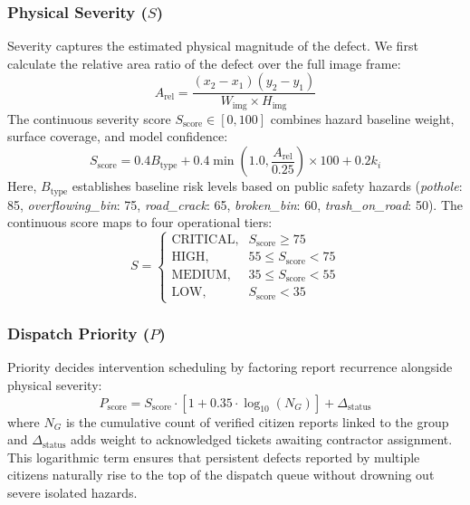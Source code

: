 \subsubsection{Physical Severity ($S$)}
Severity captures the estimated physical magnitude of the defect. We first calculate the relative area ratio of the defect over the full image frame:
\begin{equation}
A_{\text{rel}} = \frac{(x_2 - x_1)(y_2 - y_1)}{W_{\text{img}} \times H_{\text{img}}}
\end{equation}
The continuous severity score $S_{\text{score}} \in [0, 100]$ combines hazard baseline weight, surface coverage, and model confidence:
\begin{equation}
S_{\text{score}} = 0.4 B_{\text{type}} + 0.4 \min\left(1.0, \frac{A_{\text{rel}}}{0.25}\right) \times 100 + 0.2 k_i
\end{equation}
Here, $B_{\text{type}}$ establishes baseline risk levels based on public safety hazards (\textit{pothole}: 85, \textit{overflowing\_bin}: 75, \textit{road\_crack}: 65, \textit{broken\_bin}: 60, \textit{trash\_on\_road}: 50). The continuous score maps to four operational tiers:
\begin{equation}
S = \begin{cases} 
\text{CRITICAL}, & S_{\text{score}} \ge 75 \\
\text{HIGH}, & 55 \le S_{\text{score}} < 75 \\
\text{MEDIUM}, & 35 \le S_{\text{score}} < 55 \\
\text{LOW}, & S_{\text{score}} < 35 
\end{cases}
\end{equation}

\subsubsection{Dispatch Priority ($P$)}
Priority decides intervention scheduling by factoring report recurrence alongside physical severity:
\begin{equation}
P_{\text{score}} = S_{\text{score}} \cdot \left[1 + 0.35 \cdot \log_{10}(N_G)\right] + \Delta_{\text{status}}
\end{equation}
where $N_G$ is the cumulative count of verified citizen reports linked to the group and $\Delta_{\text{status}}$ adds weight to acknowledged tickets awaiting contractor assignment. This logarithmic term ensures that persistent defects reported by multiple citizens naturally rise to the top of the dispatch queue without drowning out severe isolated hazards.

